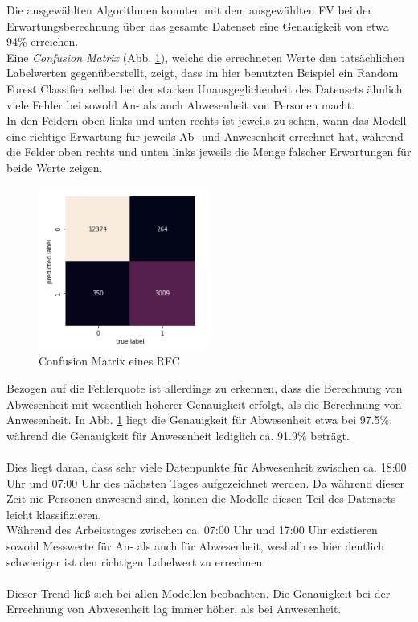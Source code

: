 Die ausgewählten Algorithmen konnten mit dem ausgewählten FV bei der Erwartungsberechnung über das gesamte 
Datenset eine Genauigkeit von etwa 94\% erreichen.\\
Eine \textit{Confusion Matrix} (Abb. \ref{fig:ConMatrix}), welche die errechneten 
Werte den tatsächlichen Labelwerten gegenüberstellt, zeigt, dass im hier benutzten Beispiel ein Random Forest Classifier 
selbst bei der starken Unausgeglichenheit des Datensets ähnlich viele Fehler bei sowohl An- als auch Abwesenheit 
von Personen macht.\\
In den Feldern oben links und unten rechts ist jeweils zu sehen, wann das Modell eine richtige Erwartung 
für jeweils Ab- und Anwesenheit errechnet hat, während die Felder oben rechts und unten links jeweils die 
Menge falscher Erwartungen für beide Werte zeigen.

\begin{figure}[h]
    \centering
    \includegraphics[width=0.5\textwidth]{pic/confusion_matrix.png}
    \caption{Confusion Matrix eines RFC}
    \label{fig:ConMatrix}
\end{figure}

Bezogen auf die Fehlerquote ist allerdings zu erkennen, dass die Berechnung von Abwesenheit mit wesentlich höherer
Genauigkeit erfolgt, als die Berechnung von Anwesenheit. In Abb. \ref{fig:ConMatrix} liegt die Genauigkeit für
Abwesenheit etwa bei 97.5\%, während die Genauigkeit für Anwesenheit lediglich ca. 91.9\% beträgt.
\\\\
Dies liegt daran, dass sehr viele Datenpunkte für Abwesenheit zwischen ca. 18:00 Uhr und
07:00 Uhr des nächsten Tages aufgezeichnet werden. Da während dieser Zeit nie Personen anwesend sind,
können die Modelle diesen Teil des Datensets leicht klassifizieren.\\
Während des Arbeitstages zwischen ca. 07:00 Uhr und 17:00 Uhr existieren sowohl Messwerte für An- als auch für 
Abwesenheit, weshalb es hier deutlich schwieriger ist den richtigen Labelwert zu errechnen.\\\\
Dieser Trend ließ sich bei allen Modellen beobachten. Die Genauigkeit bei der Errechnung von Abwesenheit
lag immer höher, als bei Anwesenheit.

